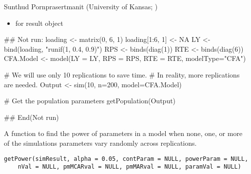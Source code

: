 \documentclass[a4paper]{book}
\begin{document}
%
\begin{Author}\relax
Sunthud Pornprasertmanit (University of Kansas; )
\end{Author}
%
\begin{SeeAlso}\relax
\begin{itemize}

\item {} for result object

\end{itemize}

\end{SeeAlso}
%
\begin{Examples}
\begin{ExampleCode}
## Not run: 
loading <- matrix(0, 6, 1)
loading[1:6, 1] <- NA
LY <- bind(loading, "runif(1, 0.4, 0.9)")
RPS <- binds(diag(1))
RTE <- binds(diag(6))
CFA.Model <- model(LY = LY, RPS = RPS, RTE = RTE, modelType="CFA")

# We will use only 10 replications to save time.
# In reality, more replications are needed.
Output <- sim(10, n=200, model=CFA.Model)

# Get the population parameters
getPopulation(Output)

## End(Not run)
\end{ExampleCode}
\end{Examples}
%
\begin{Description}\relax
A function to find the power of  parameters in a model when none, one, or more of the simulations parameters vary randomly across replications.
\end{Description}
%
\begin{Usage}
\begin{verbatim}
getPower(simResult, alpha = 0.05, contParam = NULL, powerParam = NULL, 
	nVal = NULL, pmMCARval = NULL, pmMARval = NULL, paramVal = NULL)
\end{verbatim}
\end{Usage}
%
\end{document}
